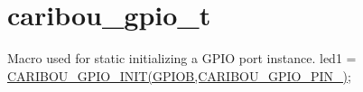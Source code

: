 \hypertarget{caribou_gpio_t-example}{\section{caribou\-\_\-gpio\-\_\-t}
}
Macro used for static initializing a G\-P\-I\-O port instance. led1 = \hyperlink{gpio_8h_a81205bf9142cd9955e4e3e02b1719288}{C\-A\-R\-I\-B\-O\-U\-\_\-\-G\-P\-I\-O\-\_\-\-I\-N\-I\-T(\-G\-P\-I\-O\-B,\-C\-A\-R\-I\-B\-O\-U\-\_\-\-G\-P\-I\-O\-\_\-\-P\-I\-N\-\_)};


\begin{DoxyCodeInclude}
\end{DoxyCodeInclude}
 